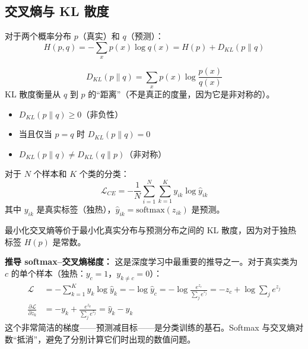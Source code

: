 \subsection{交叉熵与 KL 散度}

\begin{定义}[交叉熵]
对于两个概率分布 $p$（真实）和 $q$（预测）：
\begin{equation}
H(p, q) = -\sum_{x} p(x) \log q(x) = H(p) + D_{KL}(p \| q)
\end{equation}
\end{定义}

\begin{定义}[KL 散度]
\begin{equation}
D_{KL}(p \| q) = \sum_{x} p(x) \log \frac{p(x)}{q(x)}
\end{equation}
KL 散度衡量从 $q$ 到 $p$ 的``距离''（不是真正的度量，因为它是非对称的）。
\end{定义}

\begin{性质}[KL 散度性质]
\begin{itemize}
    \item $D_{KL}(p \| q) \geq 0$（非负性）
    \item 当且仅当 $p = q$ 时 $D_{KL}(p \| q) = 0$
    \item $D_{KL}(p \| q) \neq D_{KL}(q \| p)$（非对称）
\end{itemize}
\end{性质}

\begin{示例}[交叉熵损失]
对于 $N$ 个样本和 $K$ 个类的分类：
\begin{equation}
\mathcal{L}_{CE} = -\frac{1}{N}\sum_{i=1}^{N}\sum_{k=1}^{K} y_{ik} \log \hat{y}_{ik}
\end{equation}
其中 $y_{ik}$ 是真实标签（独热），$\hat{y}_{ik} = \text{softmax}(z_{ik})$ 是预测。

最小化交叉熵等价于最小化真实分布与预测分布之间的 KL 散度，因为对于独热标签 $H(p)$ 是常数。

\textbf{推导 softmax--交叉熵梯度：} 这是深度学习中最重要的推导之一。对于真实类为 $c$ 的单个样本（独热：$y_c = 1$，$y_{k \neq c} = 0$）：
\begin{align}
\mathcal{L} &= -\sum_{k=1}^{K} y_k \log \hat{y}_k = -\log \hat{y}_c = -\log \frac{e^{z_c}}{\sum_j e^{z_j}} = -z_c + \log \sum_j e^{z_j} \\
\frac{\partial \mathcal{L}}{\partial z_k} &= -y_k + \frac{e^{z_k}}{\sum_j e^{z_j}} = \hat{y}_k - y_k
\end{align}
这个非常简洁的梯度——预测减目标——是分类训练的基石。Softmax 与交叉熵对数``抵消''，避免了分别计算它们时出现的数值问题。
\end{示例}

